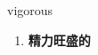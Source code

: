 
\begin{frame}
{\huge vigorous}
\begin{center}
\begin{enumerate}\Large
  \item \textbf{精力旺盛的}
\end{enumerate}
\end{center}
\end{frame}
